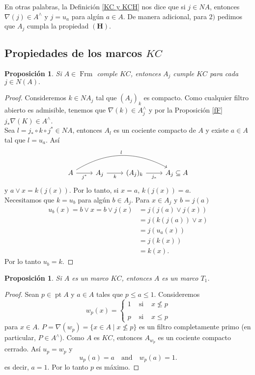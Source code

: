 \documentclass[11pt]{amsart}
\DeclareMathOperator{\pt}{pt}
\DeclareMathOperator{\Frm}{Frm}
\theoremstyle{plain}
\newtheorem{prop}[thm]{Proposición}
\theoremstyle{definition}
\begin{document}
En otras palabras, la Definición \ref{KC y KCH} nos dice que si $j\in NA$, entonces $\nabla(j)\in A^\wedge$ y $j=u_a$ para algún $a\in A$. De manera adicional, para $2)$ pedimos que $A_j$ cumpla la propiedad $\mathbf{(H)}$.\\

\subsection{Propiedades de los marcos $KC$}


\begin{prop}\label{KCquout}
    Si $A\in \Frm$ comple $KC$, entonces $A_j$ cumple $KC$ para cada $j\in N(A).$
\end{prop}

\begin{proof} %
Consideremos $k\in NA_j$ tal que $(A_j)_k$ es compacto. 
Como cualquier filtro abierto es admisible, tenemos que $\nabla(k)\in A_j^\wedge$ 
y por la Proposición \ref{fF} $j_*\nabla(K)\in A^\wedge$.\\

Sea $l=j_*\circ  k\circ j^*\in NA$, entonces $A_l$ es un cociente compacto de $A$ y existe $a\in A$ tal que $l=u_a$. Así
\[
\begin{tikzcd}
	A \arrow[r, "j^*"'] \arrow[rrr, "l", bend left] & A_j \arrow[r, "k"'] & (A_j)_k \arrow[r, "j_*"'] & A_j\subseteq A
	\end{tikzcd}\]
y $a\vee x=k(j(x))$. Por lo tanto, si $x=a$, $k(j(x))=a$.\\

Necesitamos que $k=u_b$ para algún $b\in A_j$. Para $x\in A_j$ y $b=j(a)$
\[
\begin{split}
u_b(x)= b\vee x= b\vee j(x)& =j(j(a)\vee j(x))\\
& =j(k(j(a))\vee x)\\
& =j(u_a(x))\\
& =j(k(x))\\	
&=k(x).
\end{split}
\]
Por lo tanto $u_b=k$.
\end{proof}

\begin{prop}\label{KCT1}
Si $A$ es un marco $KC$, entonces $A$ es un marco $T_1$.
\end{prop}

\begin{proof}
Sean $p\in \pt A$ y $a\in A$ tales que $p\leq a\leq 1$. Consideremos 
\[
w_p(x)=\left\{\begin{array}{lcc}
1 & \mbox{ si } & x\nleq p\\
\\
p & \mbox{ si } & x\leq p
\end{array}\right.
\]
para $x\in A$. $P=\nabla(w_p)=\{x\in A\mid x\nleq p\}$ es un filtro completamente primo (en particular, $P\in A^\wedge$). Como $A$ es $KC$, entonces $A_{w_p}$ es un cociente compacto cerrado. Así $u_p=w_p$ y
\[
u_p(a)=a\quad \mbox{and}\quad w_p(a)=1.
\]
es decir, $a=1$. Por lo tanto $p$ es máximo. 
\end{proof}
\end{document}
